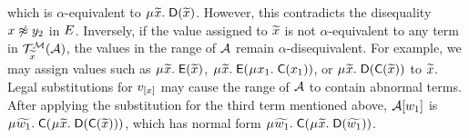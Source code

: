 \begin{examplex}
which is $\alpha$-equivalent to $\MU {\Varec{x}}.\; \const{D}( {\Varec{x}} )$.
However, this contradicts the disequality $x \not\approx y_2$ in $E$.
Inversely, if the value assigned to ${\widetilde{x}}$ is not $\alpha$-equivalent to any term in $\mathcal{T}^{\mathcal{M}}_{{\widetilde{x}}}( \mathcal{A} )$,
the values in the range of $\mathcal{A}$ remain $\alpha$-disequivalent.
For example, we may assign values such as 
$\MU {\Varec{x}}.\; \const{E}( {\Varec{x}} )$,
$\MU {\Varec{x}}.\; \const{E}( \MU x_1.\; \const{C}( x_1) )$, or
$\MU {\Varec{x}}.\; \const{D}( \const{C}( {\Varec{x}} ) )$
to ${\widetilde{x}}$.
Legal substitutions for $v_{[x]}$ may cause the range of $\mathcal{A}$ to contain abnormal terms.
After applying the substitution for the third term mentioned above,
$\mathcal{A} [w_1]$ is $\MU {\Varec{w_1}}.\; \const{C}( \MU {\Varec{x}}.\; \const{D}( \const{C}( {\Varec{x}} ) ) )$,
which has normal form
$\MU {\Varec{w_1}}.\; \const{C}( \MU {\Varec{x}}.\; \const{D}( {\Varec{w_1}} ) )$.
\xend
\end{examplex}


